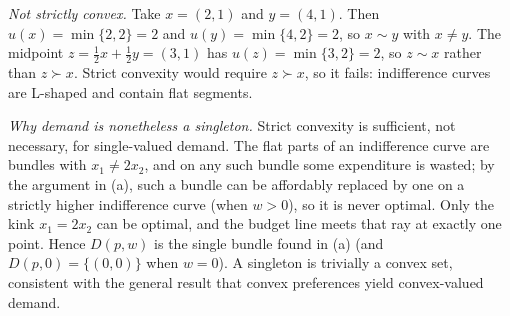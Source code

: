 \documentclass[12pt]{article}
\begin{document}
\begin{enumerate}
\begin{enumerate}[(a)]
\emph{Not strictly convex.} Take $x = (2,1)$ and $y = (4,1)$. Then $u(x) = \min\{2,2\} = 2$ and $u(y) = \min\{4,2\} = 2$, so $x \sim y$ with $x \ne y$. The midpoint $z = \tfrac12 x + \tfrac12 y = (3,1)$ has $u(z) = \min\{3,2\} = 2$, so $z \sim x$ rather than $z \succ x$. Strict convexity would require $z \succ x$, so it fails: indifference curves are L-shaped and contain flat segments.

\emph{Why demand is nonetheless a singleton.} Strict convexity is sufficient, not necessary, for single-valued demand. The flat parts of an indifference curve are bundles with $x_1 \ne 2x_2$, and on any such bundle some expenditure is wasted; by the argument in (a), such a bundle can be affordably replaced by one on a strictly higher indifference curve (when $w>0$), so it is never optimal. Only the kink $x_1 = 2x_2$ can be optimal, and the budget line meets that ray at exactly one point. Hence $D(p,w)$ is the single bundle found in (a) (and $D(p,0) = \{(0,0)\}$ when $w=0$). A singleton is trivially a convex set, consistent with the general result that convex preferences yield convex-valued demand.
\end{enumerate}

\end{enumerate}
\end{document}
